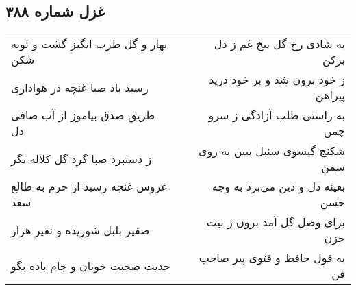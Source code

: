 \begin{center}
\section*{غزل شماره ۳۸۸}
\label{sec:sh388}
\begin{longtable}{l p{0.5cm} r}
بهار و گل طرب انگیز گشت و توبه شکن
&&
به شادی رخ گل بیخ غم ز دل برکن
\\
رسید باد صبا غنچه در هواداری
&&
ز خود برون شد و بر خود درید پیراهن
\\
طریق صدق بیاموز از آب صافی دل
&&
به راستی طلب آزادگی ز سرو چمن
\\
ز دستبرد صبا گرد گل کلاله نگر
&&
شکنج گیسوی سنبل ببین به روی سمن
\\
عروس غنچه رسید از حرم به طالع سعد
&&
بعینه دل و دین می‌برد به وجه حسن
\\
صفیر بلبل شوریده و نفیر هزار
&&
برای وصل گل آمد برون ز بیت حزن
\\
حدیث صحبت خوبان و جام باده بگو
&&
به قول حافظ و فتوی پیر صاحب فن
\\
\end{longtable}
\end{center}

